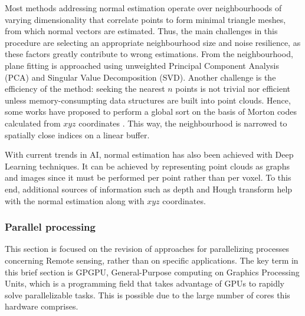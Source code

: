 Most methods addressing normal estimation operate over neighbourhoods of varying dimensionality that correlate points to form minimal triangle meshes, from which normal vectors are estimated. Thus, the main challenges in this procedure are selecting an appropriate neighbourhood size and noise resilience, as these factors greatly contribute to wrong estimations. From the neighbourhood, plane fitting is approached using unweighted Principal Component Analysis (PCA) and Singular Value Decomposition (SVD). Another challenge is the efficiency of the method: seeking the nearest $n$ points is not trivial nor efficient unless memory-consumpting data structures are built into point clouds. Hence, some works have proposed to perform a global sort on the basis of Morton codes calculated from $\textit{xyz}$ coordinates \cite{jakob_optimizing_2021}. This way, the neighbourhood is narrowed to spatially close indices on a linear buffer.

With current trends in AI, normal estimation has also been achieved with Deep Learning techniques. It can be achieved by representing point clouds as graphs \cite{lenssen_deep_2020} and images \cite{zeng_deep_2019, boulch_deep_2016} since it must be performed per point rather than per voxel. To this end, additional sources of information such as depth and Hough transform \cite{boulch_deep_2016} help with the normal estimation along with $\textit{xyz}$ coordinates. 

\subsubsection{Parallel processing}

This section is focused on the revision of approaches for parallelizing processes concerning \gls{Remote sensing}, rather than on specific applications. The key term in this brief section is GPGPU, General-Purpose computing on Graphics Processing Units, which is a programming field that takes advantage of GPUs to rapidly solve parallelizable tasks. This is possible due to the large number of cores this hardware comprises. 

